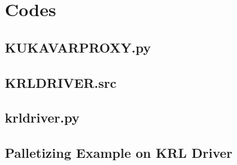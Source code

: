 	\newpage
	\section{Codes}
		\subsection{KUKAVARPROXY.py}
		

	\newpage
	\subsection{KRLDRIVER.src}
	
	
	\newpage
	\subsection{krldriver.py}
	

	\newpage
	\subsection{Palletizing Example on KRL Driver }
	


